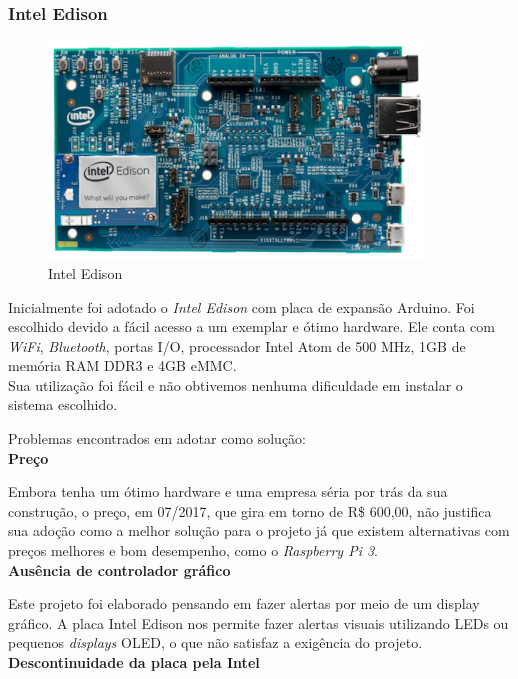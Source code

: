 \documentclass[
	12pt,				%
	oneside,			%
	a4paper,			%
	brazil				%
]{abntex2}
\begin{document}
{\subsubsection{Intel Edison}

\begin{figure}[H]
\centering
\includegraphics[width=10cm, center]{images/intel-edison-arduino-kit}
\caption{Intel Edison}
\label{Rotulo}
\end{figure}

Inicialmente foi adotado o \textit{Intel Edison} com placa de expansão Arduino. Foi escolhido devido a fácil acesso a um exemplar e ótimo hardware. Ele conta com \textit{WiFi}, \textit{Bluetooth}, portas I/O, processador Intel Atom de 500 MHz, 1GB de memória RAM DDR3 e 4GB eMMC. \\

Sua utilização foi fácil e não obtivemos nenhuma dificuldade em instalar o sistema escolhido.


Problemas encontrados em adotar como solução:
\\

\textbf{Preço}

Embora tenha um ótimo hardware e uma empresa séria por trás da sua construção, o preço, em 07/2017, que gira em torno de R\$ 600,00, não justifica sua adoção como a melhor solução para o projeto já que existem alternativas com preços melhores e bom desempenho, como o \textit{Raspberry Pi 3}.
\\

\textbf{Ausência de controlador gráfico}

Este projeto foi elaborado pensando em fazer alertas por meio de um display gráfico. A placa Intel Edison nos permite fazer alertas visuais utilizando LEDs ou pequenos \textit{displays} OLED, o que não satisfaz a exigência do projeto.  
\\

\textbf{Descontinuidade da placa pela Intel}

}
\end{document}
